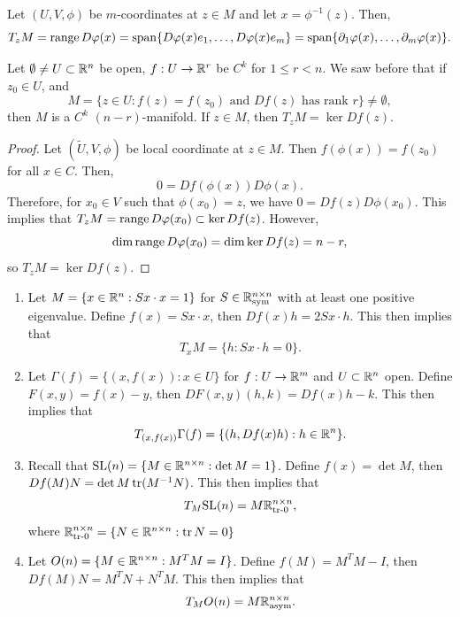 \documentclass[a4paper]{article}
\begin{document}
\begin{eg}
Let $(U, V, \phi)$ be $m$-coordinates at $z \in M$ and 
let $x = \phi^{-1}(z)$. Then, 
\[
T_z M = \operatorname{range} D\varphi(x) = \operatorname{span} \{D \varphi(x) e_1, \dots, 
D \varphi(x) e_m\} = 
\operatorname{span} \{\partial_1 \varphi(x), \dots, \partial_m \varphi(x)\}.
\]
\end{eg}

\begin{thm}
Let $\emptyset \neq U \subset \mathbb{R}^n$ be open, $f : U \to \mathbb{R}^r$
be $C^k$ for $1 \leq r < n$. We saw before that if $z_0 \in U$,
and 
\[
M = \{z \in U : \text{$f(z) = f(z_0)$ and $Df(z)$ 
has rank $r$}\} \neq \emptyset,
\]
then $M$ is a $C^k$ $(n - r)$-manifold. If $z \in M$, then  
$T_z M = \ker Df(z)$.
\end{thm}

\begin{proof}
Let $(\tilde{U}, V, \phi)$ be local coordinate at $z \in M$. 
Then $f(\phi(x)) = f(z_0)$ for all $x \in C$. Then, 
\[
0 = Df(\phi(x)) D\phi(x).
\]
Therefore, for $x_0 \in V$ such that $\phi(x_0) = z$, we have 
$0 = Df(z) D\phi(x_0)$. This implies that 
$T_z M = \operatorname{range} D\varphi(x_0) \subset \ker Df(z)$. However, 
\[
\dim \operatorname{range} D\varphi(x_0) = \dim \ker Df(z) = n - r,
\]
so 
$T_z M = \ker Df(z)$.
\end{proof}

\begin{eg}
\begin{enumerate}
\item Let $M = \{x \in \mathbb{R}^n : S x \cdot x = 1\}$ 
for $S \in \mathbb{R}^{n \times n}_{\text{sym}}$
with at least one positive eigenvalue. Define
$f(x) = Sx \cdot x$, then 
$Df(x) h = 2 Sx \cdot h$. This then implies that 
\[
T_x M = \{h : Sx \cdot h = 0\}.
\]

\item Let $\Gamma(f) = \{(x, f(x)) : x \in U\}$ for 
$f : U \to \mathbb{R}^m$ and $U \subset \mathbb{R}^n$ open. Define 
$F(x, y) = f(x) - y$, then $DF(x, y) (h, k) = Df(x) h - k$.
This then implies that 
\[
T_{(x, f(x))} \Gamma(f) = \{(h, Df(x) h) : h \in \mathbb{R}^n\}.
\]

\item Recall that $\mathrm{SL}(n) = \{M \in \mathbb{R}^{n \times n} : 
\det M = 1\}$. Define 
$f(x) = \det M$, then $Df(M) N = \det M \operatorname{tr} (M^{-1} N)$.
This then implies that 
\[
T_M \mathrm{SL}(n) = M \mathbb{R}^{n \times n}_{\text{tr-$0$}},
\]
where $\mathbb{R}^{n \times n}_{\text{tr-$0$}} = \{N \in \mathbb{R}^{n \times n}: 
\operatorname{tr} N = 0\}$

\item Let $O(n) = \{M \in \mathbb{R}^{n \times n} : M^T M = I\}$. 
Define $f(M) = M^T M - I$, then $Df(M) N = M^T N + N^T M$.
This then implies that 
\[
T_M O(n) = M \mathbb{R}^{n \times n}_{\text{asym}}.
\]
\end{enumerate}
\end{eg}
\end{document}
